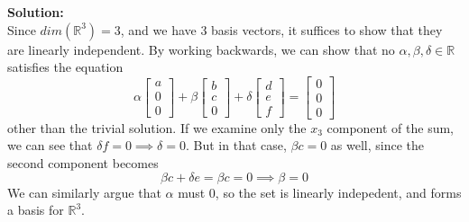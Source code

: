 \documentclass[]{article}
\newcommand{\R}{\mathbb{R}}				%
\newcommand{\bbm}{\begin{bmatrix}}		%
\newcommand{\ebm}{\end{bmatrix}}		%
\newcommand{\solution}{\vskip 0.5cm \textbf{\large Solution:} \\}
\begin{document}
\begin{enumerate}[resume]
	  \solution

	  Since $dim(\R^3) = 3$, and we have 3 basis vectors, it suffices
      to show that they are linearly independent. By working
      backwards, we can show that no $\alpha, \beta, \delta \in \R$
      satisfies the equation
      \[
      \alpha \bbm a\\0\\0\ebm + \beta \bbm b\\c\\0\ebm + \delta \bbm d\\e\\f\ebm = \bbm 0\\0\\0 \ebm
      \]
      other than the trivial solution. If we examine only the $x_3$
      component of the sum, we can see that $\delta f = 0 \implies
      \delta = 0$. But in that case, $\beta c = 0$ as well, since the
      second component becomes
      \[
      \beta c + \delta e = \beta c = 0 \implies \beta = 0
      \]
      We can similarly argue that $\alpha$ must 0, so the set is
      linearly indepedent, and forms a basis for $\R^3$.

    \end{enumerate}
\end{document}
